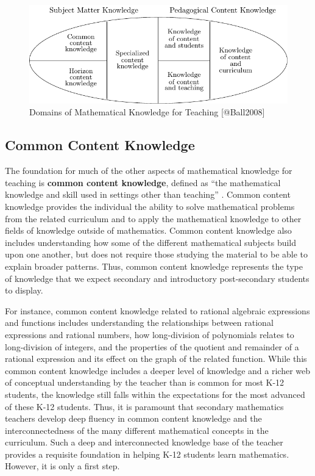 \documentclass[
]{book}
\theoremstyle{definition}
\theoremstyle{definition}
\theoremstyle{definition}
\theoremstyle{definition}
\theoremstyle{remark}
\begin{document}
\begin{figure}

{\centering \includegraphics[width=1\linewidth]{tikz/ballegg1} 

}

\caption{Domains of Mathematical Knowledge for Teaching [@Ball2008]}\label{fig:unnamed-chunk-3}
\end{figure}

\hypertarget{common-content-knowledge}{%
\subsection{Common Content Knowledge}\label{common-content-knowledge}}

The foundation for much of the other aspects of mathematical knowledge for teaching is \textbf{common content knowledge}, defined as ``the mathematical knowledge and skill used in settings other than teaching'' \citep[p.~399]{Ball2008}. Common content knowledge provides the individual the ability to solve mathematical problems from the related curriculum and to apply the mathematical knowledge to other fields of knowledge outside of mathematics. Common content knowledge also includes understanding how some of the different mathematical subjects build upon one another, but does not require those studying the material to be able to explain broader patterns. Thus, common content knowledge represents the type of knowledge that we expect secondary and introductory post-secondary students to display.

For instance, common content knowledge related to rational algebraic expressions and functions includes understanding the relationships between rational expressions and rational numbers, how long-division of polynomials relates to long-division of integers, and the properties of the quotient and remainder of a rational expression and its effect on the graph of the related function. While this common content knowledge includes a deeper level of knowledge and a richer web of conceptual understanding by the teacher than is common for most K-12 students, the knowledge still falls within the expectations for the most advanced of these K-12 students. Thus, it is paramount that secondary mathematics teachers develop deep fluency in common content knowledge and the interconnectedness of the many different mathematical concepts in the curriculum. Such a deep and interconnected knowledge base of the teacher provides a requisite foundation in helping K-12 students learn mathematics. However, it is only a first step.
\end{document}
